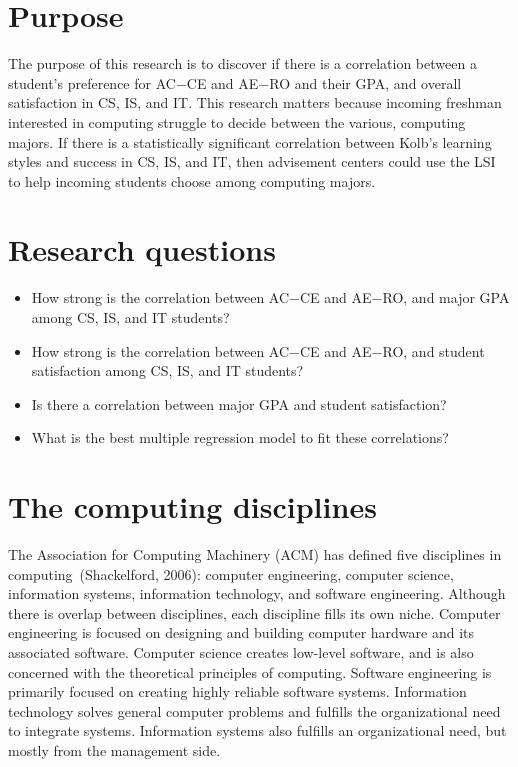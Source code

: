 \section{Purpose}
The purpose of this research is to discover if there is a correlation between a student's preference for AC$-$CE and AE$-$RO and their GPA, and overall satisfaction in CS, IS, and IT. This research matters because incoming freshman interested in computing struggle to decide between the various, computing majors. If there is a statistically significant correlation between Kolb's learning styles and success in CS, IS, and IT, then advisement centers could use the LSI to help incoming students choose among computing majors.

\section{Research questions}
\begin{itemize}
  \item How strong is the correlation between AC$-$CE and AE$-$RO, and major GPA among CS, IS, and IT students?
  \item How strong is the correlation between AC$-$CE and AE$-$RO, and student satisfaction among CS, IS, and IT students?
  \item Is there a correlation between major GPA and student satisfaction?
  \item What is the best multiple regression model to fit these correlations?
\end{itemize}

\section{The computing disciplines}
The Association for Computing Machinery (ACM) has defined five disciplines in computing~(Shackelford, 2006): computer engineering, computer science, information systems, information technology, and software engineering. Although there is overlap between disciplines, each discipline fills its own niche. Computer engineering is focused on designing and building computer hardware and its associated software. Computer science creates low-level software, and is also concerned with the theoretical principles of computing. Software engineering is primarily focused on creating highly reliable software systems. Information technology solves general computer problems and fulfills the organizational need to integrate systems. Information systems also fulfills an organizational need, but mostly from the management side.


